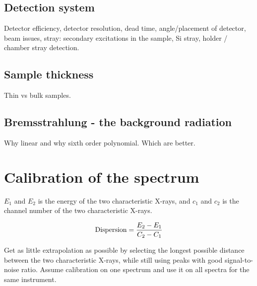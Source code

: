 \subsection{Detection system}
\label{sec:theory:empirical:detectionsystem}
Detector efficiency, detector resolution, dead time, angle/placement of detector, beam issues, stray: secondary excitations in the sample, Si stray, holder / chamber stray detection.

\subsection{Sample thickness}
\label{sec:theory:empirical:samplethickness}
Thin vs bulk samples.



%
%
\subsection{Bremsstrahlung - the background radiation}
\label{sec:theory:empirical:background}
Why linear and why sixth order polynomial. Which are better.



%
%
\section{Calibration of the spectrum}
\label{sec:theory:calibration}


$E_1$ and $E_2$ is the energy of the two characteristic X-rays, and $c_1$ and $c_2$ is the channel number of the two characteristic X-rays.

\begin{equation}
    \label{eq:theory:calibration:dispersion}
    \textnormal{Dispersion} = \frac{E_2 - E_1}{C_2 - C_1}
\end{equation}

Get as little extrapolation as possible by selecting the longest possible distance between the two characteristic X-rays, while still using peaks with good signal-to-noise ratio.
Assume calibration on one spectrum and use it on all spectra for the same instrument.


